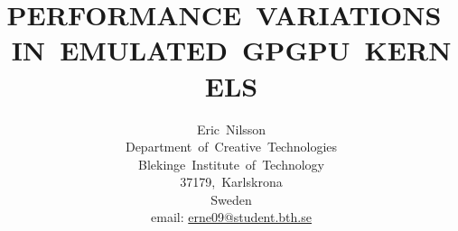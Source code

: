 \documentclass[a4paper,twocolumn,10pt]{article}
\begin{document}
\title{PERFORMANCE~VARIATIONS~IN~EMULATED~GPGPU~KERNELS}
\author{Eric~Nilsson\\
Department~of~Creative~Technologies\\
Blekinge~Institute~of~Technology\\
37179,~Karlskrona\\
Sweden\\
email: \href{mailto:erne09@student.bth.se}{erne09@student.bth.se}}
\date{}

\maketitle

\thispagestyle{empty}






\newpage



\newpage



\newpage


\end{document}
